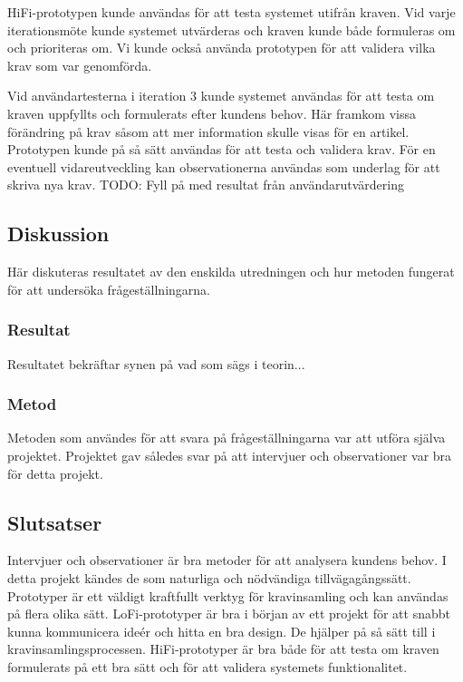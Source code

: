 HiFi-prototypen kunde användas för att testa systemet utifrån kraven. Vid varje iterationsmöte kunde systemet utvärderas och kraven kunde både formuleras om och prioriteras om. Vi kunde också använda prototypen för att validera vilka krav som var genomförda. 
 
Vid användartesterna i iteration 3 kunde systemet användas för att testa om kraven uppfyllts och formulerats efter kundens behov. Här framkom vissa förändring på krav såsom att mer information skulle visas för en artikel. Prototypen kunde på så sätt användas för att testa och validera krav. För en eventuell vidareutveckling kan observationerna användas som underlag för att skriva nya krav.
TODO: Fyll på med resultat från användarutvärdering

\subsection{Diskussion}
Här diskuteras resultatet av den enskilda utredningen och hur metoden fungerat för att undersöka frågeställningarna.
\subsubsection{Resultat}
Resultatet bekräftar synen på vad som sägs i teorin...
\subsubsection{Metod}



Metoden som användes för att svara på frågeställningarna var att utföra själva projektet. Projektet gav således svar på att intervjuer och observationer var bra för detta projekt. 


\subsection{Slutsatser}
Intervjuer och observationer är bra metoder för att analysera kundens behov. I detta projekt kändes de som naturliga och nödvändiga tillvägagångssätt. Prototyper är ett väldigt kraftfullt verktyg för kravinsamling och kan användas på flera olika sätt. LoFi-prototyper är bra i början av ett projekt för att snabbt kunna kommunicera ideér och hitta en bra design. De hjälper på så sätt till i kravinsamlingsprocessen. HiFi-prototyper är bra både för att testa om kraven formulerats på ett bra sätt och för att validera systemets funktionalitet.
